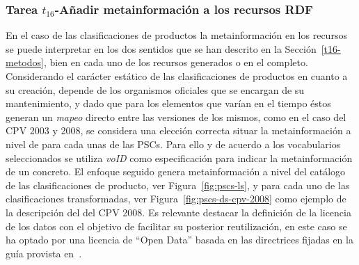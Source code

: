 \subsubsection{Tarea $t_{16}$-Añadir metainformación a los recursos RDF}\label{t16-pscs}
En el caso de las clasificaciones de productos la metainformación en los recursos se puede 
interpretar en los dos sentidos que se han descrito en la Sección~\ref{t16-metodos}, bien 
en cada uno de los recursos generados o en el \dataset completo. Considerando el carácter 
estático de las clasificaciones de productos en cuanto a su creación, depende de los organismos oficiales que 
se encargan de su mantenimiento, y dado que para los elementos que varían en el tiempo éstos 
generan un \textit{mapeo} directo entre las versiones de los mismos, como en el caso del CPV 2003 y 2008, se considera 
una elección correcta situar la metainformación a nivel de \dataset para cada unas de las PSCs. Para ello y de acuerdo 
a los vocabularios seleccionados se utiliza \textit{\gls{voID}} como especificación para indicar la metainformación 
de un \dataset concreto. El enfoque seguido genera metainformación a nivel del catálogo de las clasificaciones 
de producto, ver Figura~\ref{fig:pscs-ls}, y para cada uno de las clasificaciones transformadas, ver Figura~\ref{fig:pscs-ds-cpv-2008} como ejemplo 
de la descripción del \dataset del \gls{CPV} 2008. Es relevante destacar la definición de la licencia de los datos con el objetivo 
de facilitar su posterior reutilización, en este caso se ha optado por una licencia de ``Open Data'' basada en las directrices 
fijadas en la guía provista en~\cite{od-license}.

